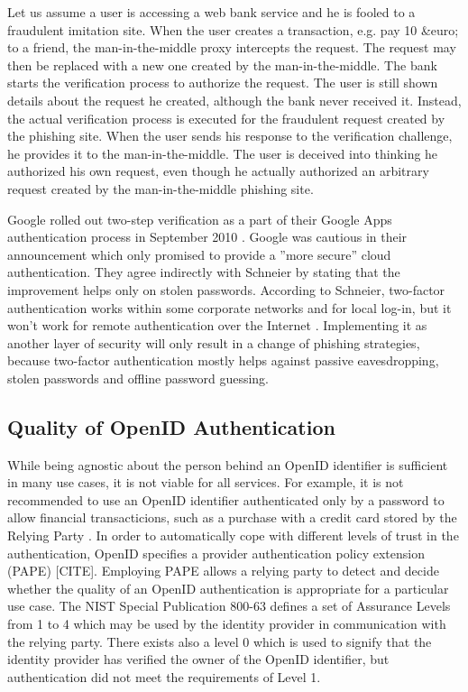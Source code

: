 \documentclass{tktltiki}
\begin{document}
    Let us assume a user is accessing a web bank service and he is fooled to a fraudulent imitation site. When the user creates a transaction, e.g. pay 10 &euro; to a friend, the man-in-the-middle proxy intercepts the request. The request may then be replaced with a new one created by the man-in-the-middle. The bank starts the verification process to authorize the request. The user is still shown details about the request he created, although the bank never received it. Instead, the actual verification process is executed for the fraudulent request created by the phishing site. When the user sends his response to the verification challenge, he provides it to the man-in-the-middle. The user is deceived into thinking he authorized his own request, even though he actually authorized an arbitrary request created by the man-in-the-middle phishing site. 

    Google rolled out two-step verification as a part of their Google Apps authentication process in September 2010 \cite{google_2step_2010}. Google was cautious in their announcement which only promised to provide a ''more secure'' cloud authentication. They agree indirectly with Schneier \cite{schneier_2factor_2005} by stating that the improvement helps only on stolen passwords. According to Schneier, two-factor authentication works within some corporate networks and for local log-in, but it won't work for remote authentication over the Internet \cite{schneier_2factor_2005}. Implementing it as another layer of security will only result in a change of phishing strategies, because two-factor authentication mostly helps against passive eavesdropping, stolen passwords and offline password guessing.



\subsection{Quality of OpenID Authentication}


   While being agnostic about the person behind an OpenID identifier is sufficient in many use cases, it is not viable for all services. For example, it is not recommended to use an OpenID identifier authenticated only by a password to allow financial transacticions, such as a purchase with a credit card stored by the Relying Party \cite{yahoo_openid_bestpractices_2010}. In order to automatically cope with different levels of trust in the authentication, OpenID specifies a provider authentication policy extension (PAPE) \cite{openid_2.0_specification_07, openid_2.0_pape_07}[CITE]. Employing PAPE allows a relying party to detect and decide whether the quality of an OpenID authentication is appropriate for a particular use case. The NIST Special Publication 800-63 \cite{NIST_SP800-63} defines a set of Assurance Levels from 1 to 4 which may be used by the identity provider in communication with the relying party. There exists also a level 0 which is used to signify that the identity provider has verified the owner of the OpenID identifier, but authentication did not meet the requirements of Level 1.
\end{document}
